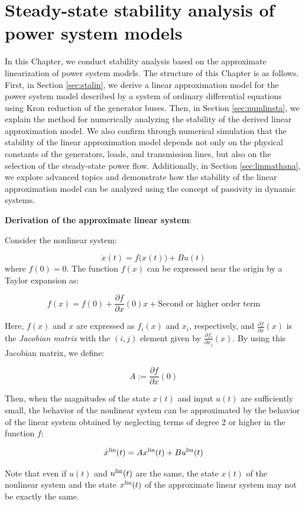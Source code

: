 \documentclass[graybox, envcountchap]{svmult}
\begin{document}
\chapter{Steady-state stability analysis of power system
models}\label{sec:staana}

In this Chapter, we conduct stability analysis based on the approximate
linearization of power system models. The structure of this Chapter is as
follows. First, in Section \ref{sec:stalin}, we derive a linear approximation
model for the power system model described by a system of ordinary differential
equations using Kron reduction of the generator buses. Then, in Section
\ref{sec:numlinsta}, we explain the method for numerically analyzing the
stability of the derived linear approximation model. We also confirm through
numerical simulation that the stability of the linear approximation model
depends not only on the physical constants of the generators, loads, and
transmission lines, but also on the selection of the steady-state power flow.
Additionally, in Section \ref{sec:linmathana}, we explore advanced topics and
demonstrate how the stability of the linear approximation model can be analyzed
using the concept of passivity in dynamic systems.

\begin{COLUMN}
\noindent \textbf{Derivation of the approximate linear system}:

Consider the nonlinear system:

\begin{equation*}
  \dot{x}(t) = f\bigl(x(t)\bigr) + Bu(t) 
\end{equation*}
where $f(0)=0$. The function $f(x)$ can be expressed near the origin by a Taylor
expansion as:

\[
  f(x)=f(0) + \frac{\partial f}{\partial x} (0) x + \mbox{Second or higher order term}
\]

Here, $f(x)$ and $x$ are expressed as $f_i(x)$ and $x_i$, respectively, and
$\tfrac{\partial f}{\partial x}(x)$ is the \emph{Jacobian matrix} with the
$(i,j)$ element given by $\tfrac{\partial f_i}{\partial x_j}(x)$. By using this
Jacobian matrix, we define:

\[
  A:=\frac{\partial f}{\partial x} (0)
\]

Then, when the magnitudes of the state $x(t)$ and input $u(t)$ are sufficiently
small, the behavior of the nonlinear system can be approximated by the behavior
of the linear system obtained by neglecting terms of degree 2 or higher in the
function $f$:

\begin{equation*}
  \dot{x}^{\rm lin}(t) = Ax^{\rm lin}(t) + Bu^{\rm lin}(t) 
\end{equation*}

Note that even if $u(t)$ and $u^{\rm lin}(t)$ are the same, the state $x(t)$ of
the nonlinear system and the state $x^{\rm lin}(t)$ of the approximate linear
system may not be exactly the same.
\end{COLUMN}
\end{document}
